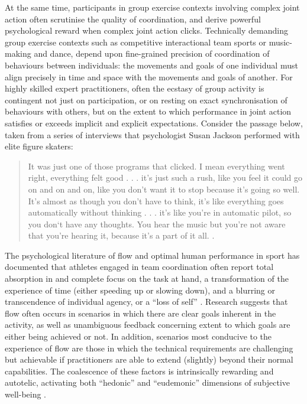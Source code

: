 \begin{CJK}{UTF8}{gbsn}
At the same time, participants in group exercise contexts involving complex joint action often scrutinise the quality of coordination, and derive powerful psychological reward when complex joint action clicks.  Technically demanding group exercise contexts such as competitive interactional team sports or music-making and dance, depend upon fine-grained precision of coordination of behaviours between individuals: the movements and goals of one individual must align precisely in time and space with the movements and goals of another.  For highly skilled expert practitioners, often the ecstasy of group activity is contingent not just on participation, or on resting on exact synchronisation of behaviours with others, but on the extent to which performance in joint action satisfies or exceeds implicit and explicit expectations.  Consider the passage below, taken from a series of interviews that psychologist Susan Jackson performed with elite figure skaters:
  \begin{quotation}
    It was just one of those programs that clicked. I mean everything went right, everything felt good . . . it's just such a rush, like you feel it could go on and on and on, like you don't want it to stop because it's going so well.  It's almost as though you don't have to think, it's like everything goes automatically without thinking . . . it's like you're in automatic pilot, so you don‘t have any thoughts.  You hear the music but you're not aware that you're hearing it, because it's a part of it all. \citep[168]{Jackson1992}.
  \end{quotation}

The psychological literature of flow and optimal human performance in sport has documented that athletes engaged in team coordination often report total absorption in and complete focus on the task at hand, a transformation of the experience of time (either speeding up or slowing down), and a blurring or transcendence of individual agency, or a ``loss of self''   \citep{Csikszentmihalyi1992,Jackson1995,Jackson1999,McNeill1995}.  Research suggests that flow often occurs in scenarios in which there are clear goals inherent in the activity, as well as unambiguous feedback concerning extent to which goals are either being achieved or not.  In addition, scenarios most conducive to the experience of flow are those in which the technical requirements are challenging but achievable if practitioners are able to extend (slightly) beyond their normal capabilities\citep{Fong2015}.  The coalescence of these factors is intrinsically rewarding and autotelic\citep{Csikszentmihalyi1975}, activating both ``hedonic'' and ``eudemonic'' dimensions of subjective well-being \citep{Huta2010,Fave2009}.



\end{CJK}
